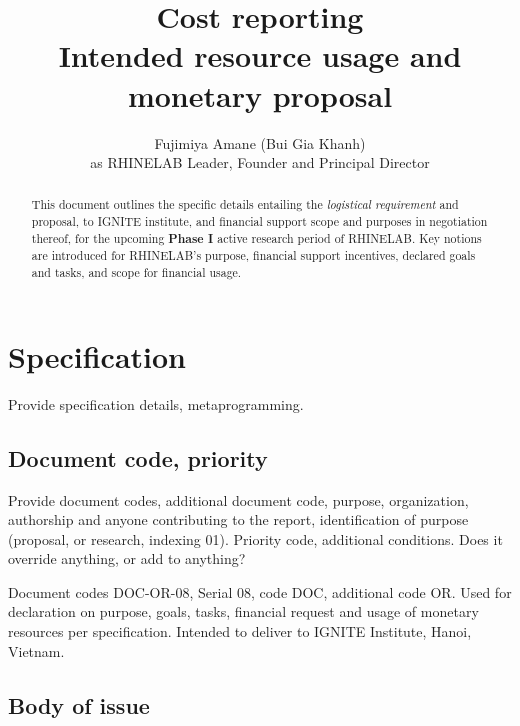 \documentclass[10pt,a4paper]{article}
\title{\textbf{Cost reporting} \\ Intended resource usage and monetary proposal} %
\author{Fujimiya Amane (Bui Gia Khanh) \\ {\small as RHINELAB Leader, Founder and Principal Director}} %
\affiliation{} %
\begin{document}
\maketitle

\begin{abstract}
    \noindent
    This document outlines the specific details entailing the \textit{logistical requirement} and proposal, to IGNITE institute, and financial support scope and purposes in negotiation thereof, for the upcoming \textbf{Phase I} active research period of RHINELAB. Key notions are introduced for RHINELAB's purpose, financial support incentives, declared goals and tasks, and scope for financial usage. 

    \keywords{}
\end{abstract}

\vspace{2.5cm}



\thispagestyle{firstpage}

\pagebreak


\newgeometry{} %

\section{Specification}
\label{sec:spec}

Provide specification details, metaprogramming. 

\subsection{Document code, priority}

{\footnotesize
Provide document codes, additional document code, purpose, organization, authorship and anyone contributing to the report, identification of purpose (proposal, or research, indexing 01). Priority code, additional conditions. Does it override anything, or add to anything?
}

Document codes DOC-OR-08, Serial 08, code DOC, additional code OR. Used for declaration on purpose, goals, tasks, financial request and usage of monetary resources per specification. Intended to deliver to IGNITE Institute, Hanoi, Vietnam. 

\subsection{Body of issue}
\end{document}
